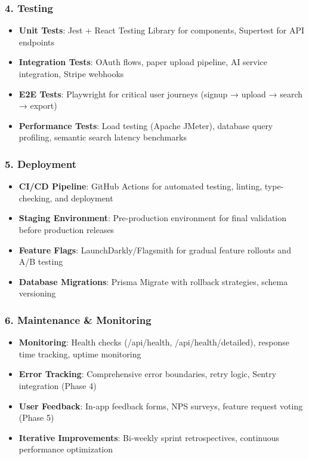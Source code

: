 \subsubsection{4. Testing}

\begin{itemize}
    \item \textbf{Unit Tests}: Jest + React Testing Library for components, Supertest for API endpoints
    \item \textbf{Integration Tests}: OAuth flows, paper upload pipeline, AI service integration, Stripe webhooks
    \item \textbf{E2E Tests}: Playwright for critical user journeys (signup → upload → search → export)
    \item \textbf{Performance Tests}: Load testing (Apache JMeter), database query profiling, semantic search latency benchmarks
\end{itemize}

\subsubsection{5. Deployment}

\begin{itemize}
    \item \textbf{CI/CD Pipeline}: GitHub Actions for automated testing, linting, type-checking, and deployment
    \item \textbf{Staging Environment}: Pre-production environment for final validation before production releases
    \item \textbf{Feature Flags}: LaunchDarkly/Flagsmith for gradual feature rollouts and A/B testing
    \item \textbf{Database Migrations}: Prisma Migrate with rollback strategies, schema versioning
\end{itemize}

\subsubsection{6. Maintenance \& Monitoring}

\begin{itemize}
    \item \textbf{Monitoring}: Health checks (/api/health, /api/health/detailed), response time tracking, uptime monitoring
    \item \textbf{Error Tracking}: Comprehensive error boundaries, retry logic, Sentry integration (Phase 4)
    \item \textbf{User Feedback}: In-app feedback forms, NPS surveys, feature request voting (Phase 5)
    \item \textbf{Iterative Improvements}: Bi-weekly sprint retrospectives, continuous performance optimization
\end{itemize}
